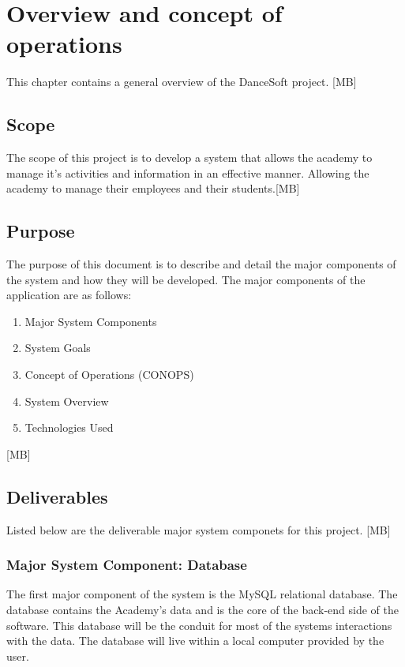 
\chapter{Overview and concept of operations}

This chapter contains a  general overview of the DanceSoft project. [MB]


\section{Scope}
The scope of this project is to develop a system that allows the academy to manage it's activities and information in an effective manner. Allowing the academy to manage their employees and their students.[MB] 


\section{Purpose}
The purpose of this document is to describe and detail the major components of the system and how
they will be developed. The major components of the application are as follows:

\begin{enumerate}
\item Major System Components
\item System Goals
\item Concept of Operations (CONOPS)
\item System Overview
\item Technologies Used
\end{enumerate} [MB]

\section{Deliverables} 
Listed below are the deliverable major system componets for this project. [MB]

\subsection{Major System Component: Database}
The first major component of the system is the MySQL relational database. The database contains the Academy's data and is the core of the back-end side of the software. This database will be the conduit for most of the systems interactions with the data. The database will live within a local computer provided by the user.  

